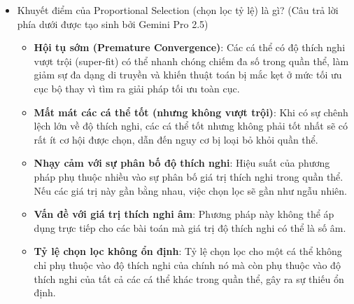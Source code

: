 \documentclass{book}
\begin{document}
\begin{itemize}
    \item Khuyết điểm của Proportional Selection (chọn lọc tỷ lệ) là gì? (Câu trả lời phía dưới được tạo sinh bởi Gemini Pro 2.5)
    \begin{itemize}
        \item \textbf{Hội tụ sớm (Premature Convergence)}: Các cá thể có độ thích nghi vượt trội (super-fit) có thể nhanh chóng chiếm đa số trong quần thể, làm giảm sự đa dạng di truyền và khiến thuật toán bị mắc kẹt ở mức tối ưu cục bộ thay vì tìm ra giải pháp tối ưu toàn cục.
        \item \textbf{Mất mát các cá thể tốt (nhưng không vượt trội)}: Khi có sự chênh lệch lớn về độ thích nghi, các cá thể tốt nhưng không phải tốt nhất sẽ có rất ít cơ hội được chọn, dẫn đến nguy cơ bị loại bỏ khỏi quần thể.
        \item \textbf{Nhạy cảm với sự phân bố độ thích nghi}: Hiệu suất của phương pháp phụ thuộc nhiều vào sự phân bố giá trị thích nghi trong quần thể. Nếu các giá trị này gần bằng nhau, việc chọn lọc sẽ gần như ngẫu nhiên.
        \item \textbf{Vấn đề với giá trị thích nghi âm}: Phương pháp này không thể áp dụng trực tiếp cho các bài toán mà giá trị độ thích nghi có thể là số âm.
        \item \textbf{Tỷ lệ chọn lọc không ổn định}: Tỷ lệ chọn lọc cho một cá thể không chỉ phụ thuộc vào độ thích nghi của chính nó mà còn phụ thuộc vào độ thích nghi của tất cả các cá thể khác trong quần thể, gây ra sự thiếu ổn định.
    \end{itemize}
\end{itemize}
\end{document}
